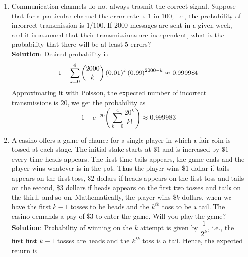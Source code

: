 \documentclass{article}
\newcommand{\dsum}{\displaystyle\sum}
\newcommand{\bkt}[1]{\left(#1\right)}
\newcommand{\soln}[1]{\textbf{Solution}:#1}
\begin{document}
\begin{enumerate}
		A production process is partitioned into two independent sub-processes. The probabilities of a defective component in the first and second sub-processes are $0.01$ and $0.02$, respectively. If $50$ units are produced, what is the probability there will be fewer than $3$ defective units?\\
		\soln{
		Probability of a unit being non-defective is $\bkt{1-0.01} \times \bkt{1-0.02}$. Hence, the probability of a unit being defective is $1-\bkt{1-0.01} \times \bkt{1-0.02} = 0.0302$. The desired probability is given as
		$$\dsum_{k=0}^2 \dbinom{50}k \bkt{0.0302}^k\bkt{0.9698}^{50-k}  \approx 0.8082$$
		We could also approximate this probability with a Poisson random variable with expected defectives to be $50 \times 0.0302 = 1.51$. Hence, the desired probability is
		$$\dsum_{k=2}^2 e^{-1.51} \dfrac{1.51^k}{k!} \approx 0.8063$$
		}
		\item
		Communication channels do not always trasmit the correct signal. Suppose that for a particular channel the error rate is $1$ in $100$, i.e., the probability of incorrect transmission is $1/100$. If $2000$ messages are sent in a given week, and it is assumed that their transmissions are independent, what is the probability that there will be at least $5$ errors?\\
		\soln{
		Desired probability is $$1-\dsum_{k=0}^4 \dbinom{2000}k \bkt{0.01}^k \bkt{0.99}^{2000-k} \approx 0.999984$$
		Approximating it with Poisson, the expected number of incorrect transmissions is $20$, we get the probability as
		$$1-e^{-20}\bkt{\dsum_{k=0}^4 \dfrac{20^k}{k!}} \approx 0.999983$$
		}
		\item
		A casino offers a game of chance for a single player in which a fair coin is tossed at each stage. The initial stake starts at $\$ 1$ and is increased by $\$ 1$ every time heads appears. The first time tails appears, the game ends and the player wins whatever is in the pot. Thus the player wins $\$1$ dollar if tails appears on the first toss, $\$2$ dollars if heads appears on the first toss and tails on the second, $\$3$ dollars if heads appears on the first two tosses and tails on the third, and so on. Mathematically, the player wins $\$k$ dollars, when we have the first $k-1$ tosses to be heads and the $k^{th}$ toss to be a tail. The casino demands a pay of $\$3$ to enter the game. Will you play the game?\\
		\soln{
		Probability of winning on the $k$ attempt is given by $\dfrac1{2^k}$, i.e., the first first $k-1$ tosses are heads and the $k^{th}$ toss is a tail. Hence, the expected return is
}
\end{enumerate}
\end{document}

